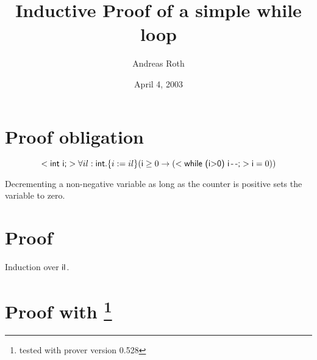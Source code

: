 \documentclass[11pt]{article}
\newcommand{\java}[1]{\mbox{\textsf{#1}}}
\begin{document}
\title{Inductive Proof of a simple while loop}
\author{Andreas Roth}
\date{April 4, 2003}
\maketitle

\section*{Proof obligation}
\[<\java{int i;}> \forall il:\java{int}. \{i:=il\}(\java{i}\geq 0 \rightarrow ( <\java{while (i$>$0) i\,-\,-;}> \java{i}=0))\]

\noindent Decrementing a non-negative variable as long as the counter is
positive sets the variable to zero.

\section*{Proof}

Induction over $\java{il}$.

\section*{Proof with \KeY\footnote{tested with prover version 0.528}}
\end{document}
